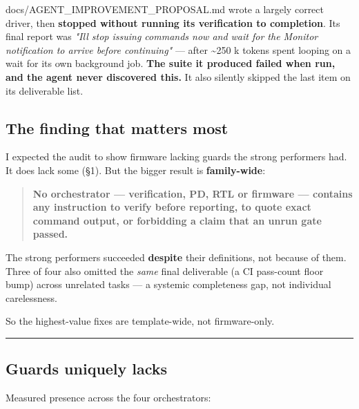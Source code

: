 \begin{relocated}{docs/AGENT_IMPROVEMENT_PROPOSAL.md}
 wrote a largely correct driver, then
\textbf{stopped without running its verification to completion}. Its
final report was \emph{"I\textquotesingle ll stop issuing commands now
and wait for the Monitor notification to arrive before continuing"} ---
after \textasciitilde250 k tokens spent looping on a wait for its own
background job. \textbf{The suite it produced failed when run, and the
agent never discovered this.} It also silently skipped the last item on
its deliverable list.

\subsection{The finding that matters most}\label{tm:dec:agent-improvement-proposal:the-finding-that-matters-most}

I expected the audit to show firmware lacking guards the strong
performers had. It does lack some (§1). But the bigger result is
\textbf{family-wide}:

\begin{quote}
\textbf{No orchestrator --- verification, PD, RTL or firmware ---
contains any instruction to verify before reporting, to quote exact
command output, or forbidding a claim that an unrun gate passed.}
\end{quote}

The strong performers succeeded \textbf{despite} their definitions, not
because of them. Three of four also omitted the \emph{same} final
deliverable (a CI pass-count floor bump) across unrelated tasks --- a
systemic completeness gap, not individual carelessness.

So the highest-value fixes are template-wide, not firmware-only.

\begin{center}\rule{0.5\linewidth}{0.5pt}\end{center}

\subsection{\texorpdfstring{Guards 
uniquely lacks}{Guards  uniquely lacks}}\label{tm:dec:agent-improvement-proposal:1-guards-firmware-orchestrator-uniquely-lacks}

Measured presence across the four  orchestrators:

{\small\setlength{\tabcolsep}{4pt}

}
\end{relocated}
